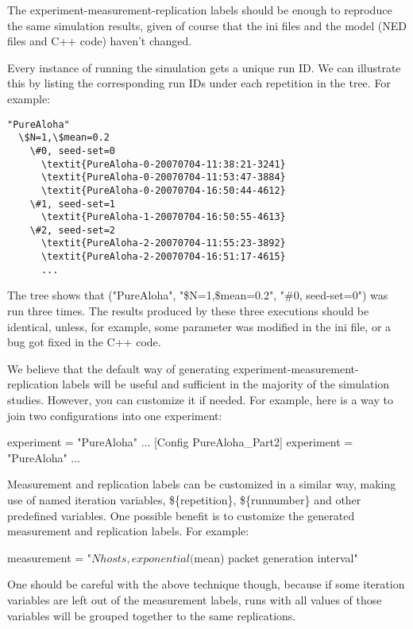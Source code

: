 The experiment-measurement-replication labels should be enough to
reproduce the same simulation results, given of course that the ini
files and the model (NED files and C++ code) haven't changed.

Every instance of running the simulation gets a unique run ID. We can
illustrate this by listing the corresponding run IDs under each
repetition in the tree. For example:

\begin{Verbatim}[commandchars=\\\{\}]
"PureAloha"
  \$N=1,\$mean=0.2
    \#0, seed-set=0
      \textit{PureAloha-0-20070704-11:38:21-3241}
      \textit{PureAloha-0-20070704-11:53:47-3884}
      \textit{PureAloha-0-20070704-16:50:44-4612}
    \#1, seed-set=1
      \textit{PureAloha-1-20070704-16:50:55-4613}
    \#2, seed-set=2
      \textit{PureAloha-2-20070704-11:55:23-3892}
      \textit{PureAloha-2-20070704-16:51:17-4615}
      ...
\end{Verbatim}


The tree shows that ("PureAloha", "\$N=1,\$mean=0.2", "\#0, seed-set=0")
was run three times. The results produced
by these three executions should be identical, unless, for example,
some parameter was modified in the ini file, or a bug got fixed in the
C++ code.

We believe that the default way of generating
experiment-measurement-replication labels will be useful and
sufficient in the majority of the simulation studies. However, you can
customize it if needed. For example, here is a way to join two
configurations into one experiment:

\begin{inifile}
experiment = "PureAloha"
...
[Config PureAloha_Part2]
experiment = "PureAloha"
...
\end{inifile}


Measurement and replication labels can be customized in a similar way,
making use of named iteration variables, \$\{repetition\},
\$\{runnumber\} and other predefined variables. One possible benefit is
to customize the generated measurement and replication labels. For
example:

\begin{inifile}
measurement = "${N} hosts, exponential(${mean}) packet generation interval"
\end{inifile}


One should be careful with the above technique though, because if some
iteration variables are left out of the measurement labels, runs with
all values of those variables will be grouped together to the same
replications.


